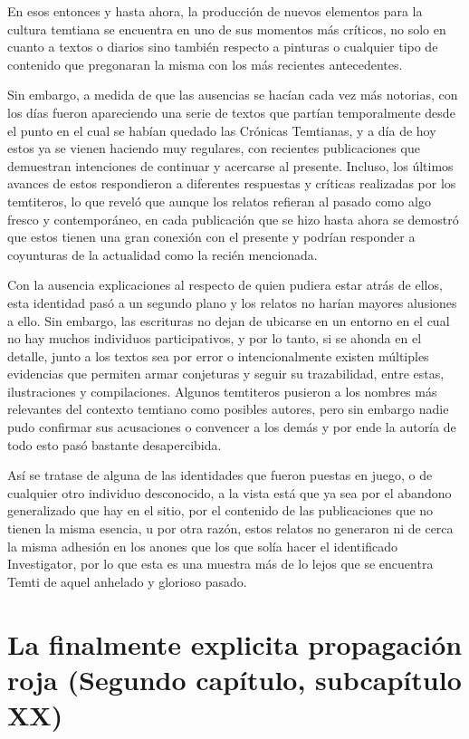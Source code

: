 \documentclass[
  spanish,
]{book}
\begin{document}
En esos entonces y hasta ahora, la producción de nuevos elementos para la cultura temtiana se encuentra en uno de sus momentos más críticos, no solo en cuanto a textos o diarios sino también respecto a pinturas o cualquier tipo de contenido que pregonaran la misma con los más recientes antecedentes.

Sin embargo, a medida de que las ausencias se hacían cada vez más notorias, con los días fueron apareciendo una serie de textos que partían temporalmente desde el punto en el cual se habían quedado las Crónicas Temtianas, y a día de hoy estos ya se vienen haciendo muy regulares, con recientes publicaciones que demuestran intenciones de continuar y acercarse al presente. Incluso, los últimos avances de estos respondieron a diferentes respuestas y críticas realizadas por los temtiteros, lo que reveló que aunque los relatos refieran al pasado como algo fresco y contemporáneo, en cada publicación que se hizo hasta ahora se demostró que estos tienen una gran conexión con el presente y podrían responder a coyunturas de la actualidad como la recién mencionada.

Con la ausencia explicaciones al respecto de quien pudiera estar atrás de ellos, esta identidad pasó a un segundo plano y los relatos no harían mayores alusiones a ello. Sin embargo, las escrituras no dejan de ubicarse en un entorno en el cual no hay muchos individuos participativos, y por lo tanto, si se ahonda en el detalle, junto a los textos sea por error o intencionalmente existen múltiples evidencias que permiten armar conjeturas y seguir su trazabilidad, entre estas, ilustraciones y compilaciones. Algunos temtiteros pusieron a los nombres más relevantes del contexto temtiano como posibles autores, pero sin embargo nadie pudo confirmar sus acusaciones o convencer a los demás y por ende la autoría de todo esto pasó bastante desapercibida.

Así se tratase de alguna de las identidades que fueron puestas en juego, o de cualquier otro individuo desconocido, a la vista está que ya sea por el abandono generalizado que hay en el sitio, por el contenido de las publicaciones que no tienen la misma esencia, u por otra razón, estos relatos no generaron ni de cerca la misma adhesión en los anones que los que solía hacer el identificado Investigator, por lo que esta es una muestra más de lo lejos que se encuentra Temti de aquel anhelado y glorioso pasado.

\hypertarget{la-finalmente-explicita-propagaciuxf3n-roja-segundo-capuxedtulo-subcapuxedtulo-xx}{%
\section{La finalmente explicita propagación roja (Segundo capítulo, subcapítulo XX)}\label{la-finalmente-explicita-propagaciuxf3n-roja-segundo-capuxedtulo-subcapuxedtulo-xx}}
\end{document}
